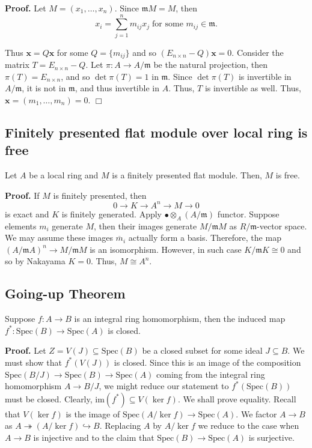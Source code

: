 \documentclass{template}
\newcommand{\qedwhite}{\hfill \ensuremath{\Box}}
\begin{document}
\textbf{Proof.} Let $M=(x_1,\dots,x_n)$. Since $\mathfrak{m}M=M$, then
\begin{equation*}
    x_i = \sum_{j=1}^n m_{ij}x_j \; \text{for some $m_{ij} \in \mathfrak{m}$.}
\end{equation*}

Thus $\mathbf{x} = Q\mathbf{x}$ for some $Q=\{m_{ij}\}$ and so $(E_{n \times
n}-Q)\mathbf{x}=0$. Consider the matrix $T = E_{n \times n} - Q$. Let $\pi: A
\to A/\mathfrak{m}$ be the natural projection, then $\pi(T) = E_{n \times n}$,
and so $\det\pi(T) = 1$ in $\mathfrak{m}$. Since $\det\pi(T)$ is invertible in
$A/\mathfrak{m}$, it is not in $\mathfrak{m}$, and thus invertible in $A$. Thus,
$T$ is invertible as well. Thus, $\mathbf{x}=(m_1,\dots,m_n)=0$. \qedwhite

\subsection{Finitely presented flat module over local ring is free}

\begin{lemma}
    Let $A$ be a local ring and $M$ is a finitely presented flat module. Then,
    $M$ is free.
\end{lemma}

\textbf{Proof.} If $M$ is finitely presented, then
\begin{equation*}
    0 \to K \to A^n \to M \to 0
\end{equation*}
is exact and $K$ is finitely generated. Apply $\bullet \otimes_A
(A/\mathfrak{m})$ functor. Suppose elements $m_i$ generate $M$, then their images
generate $M/\mathfrak{m}M$ as $R/\mathfrak{m}$-vector space. We may assume these
images $\overline{m}_i$ actually form a basis. Therefore, the map
$(A/\mathfrak{m}A)^n \to M/\mathfrak{m}M$ is an isomorphism. However, in such
case $K/\mathfrak{m}K \cong 0$ and so by Nakayama $K=0$. Thus, $M \cong A^n$.

\subsection{Going-up Theorem}

\begin{theorem}
    Suppose $f:A \to B$ is an integral ring homomorphism, then the induced map
    $f^*:\text{Spec}(B) \to \text{Spec}(A)$ is closed.
\end{theorem}

\textbf{Proof.} Let $Z = V(J) \subseteq \text{Spec}(B)$ be a closed subset for
some ideal $J \subseteq B$. We must show that $f^*(V(J))$ is closed. Since this
is an image of the composition $\text{Spec}(B/J) \to \text{Spec}(B) \to
\text{Spec}(A)$ coming from the integral ring homomorphism $A \to B/J$, we might
reduce our statement to $f^*(\text{Spec}(B))$ must be closed. Clearly,
$\text{im}(f^*) \subseteq V(\ker f)$. We shall prove equality. Recall that
$V(\ker f)$ is the image of $\text{Spec}(A/\ker f) \to \text{Spec}(A)$. We
factor $A \to B$ as $A \twoheadrightarrow (A/\ker f) \hookrightarrow B$.
Replacing $A$ by $A/\ker f$ we reduce to the case when $A \to B$ is 
injective and to the claim that $\text{Spec}(B) \to \text{Spec}(A)$ is 
surjective.
\end{document}

